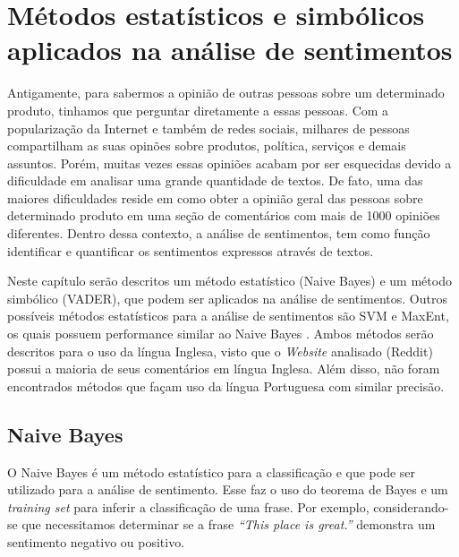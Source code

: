 \chapter{Métodos estatísticos e simbólicos aplicados na análise de sentimentos}
\label{cap:Classificadores}

Antigamente, para sabermos a opinião de outras pessoas sobre um
determinado produto, tinhamos que perguntar diretamente a essas pessoas. Com a
popularização da Internet e também de redes sociais, milhares de pessoas
compartilham as suas opinões sobre produtos, política, serviços e
demais assuntos. Porém, muitas vezes essas opiniões acabam
por ser esquecidas devido a dificuldade em analisar uma grande quantidade de
textos. De fato, uma das maiores dificuldades reside em como obter a opinião
geral das pessoas sobre determinado produto em uma seção de comentários com mais
de 1000 opiniões diferentes. Dentro dessa contexto, a análise de sentimentos,
tem como função identificar e quantificar os sentimentos expressos através de
textos.

Neste capítulo serão descritos um método estatístico (Naive Bayes) e um método
simbólico (\ac{VADER}), que podem ser aplicados na análise de sentimentos.
Outros possíveis métodos estatísticos para a análise de sentimentos são \ac{SVM} e \ac{MaxEnt},
os quais possuem performance similar ao Naive Bayes \cite{Pang:2002:TUS:1118693.1118704}. Ambos
métodos serão descritos para o uso da língua Inglesa, visto que o \textit{Website} analisado (Reddit) possui a maioria de seus
comentários em língua Inglesa. Além disso, não foram encontrados métodos que
façam uso da língua Portuguesa com similar precisão.





\section{Naive Bayes}

O Naive Bayes é um método estatístico para a classificação e que pode ser
utilizado para a análise de sentimento. Esse faz o uso do teorema de Bayes e um
\textit{training set} para inferir a classificação de uma frase. Por exemplo,
considerando-se que necessitamos determinar se a frase \textit{``This place is
great.''} demonstra um sentimento negativo ou positivo.

